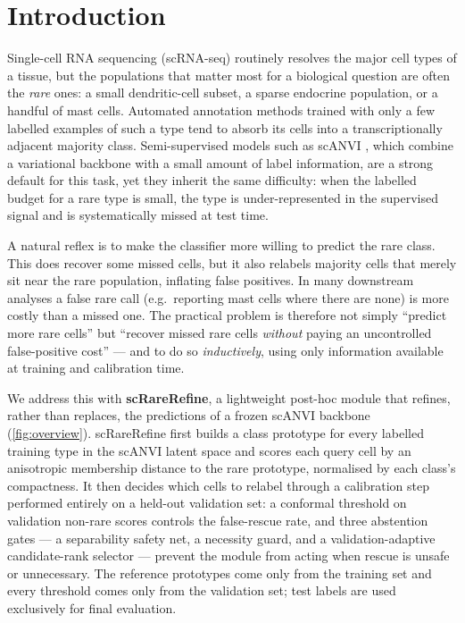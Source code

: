 \section{Introduction}
\label{sec:intro}

Single-cell RNA sequencing (scRNA-seq) routinely resolves the major cell types of a tissue, but the populations
that matter most for a biological question are often the \emph{rare} ones: a small dendritic-cell subset, a
sparse endocrine population, or a handful of mast cells. Automated annotation methods trained with only a few
labelled examples of such a type tend to absorb its cells into a transcriptionally adjacent majority class.
Semi-supervised models such as scANVI \citep{xu2021scanvi}, which combine a variational backbone with a small
amount of label information, are a strong default for this task, yet they inherit the same difficulty: when the
labelled budget for a rare type is small, the type is under-represented in the supervised signal and is
systematically missed at test time.

A natural reflex is to make the classifier more willing to predict the rare class. This does recover some missed
cells, but it also relabels majority cells that merely sit near the rare population, inflating false positives.
In many downstream analyses a false rare call (e.g.\ reporting mast cells where there are none) is more costly than
a missed one. The practical problem is therefore not simply ``predict more rare cells'' but ``recover missed rare
cells \emph{without} paying an uncontrolled false-positive cost'' --- and to do so \emph{inductively}, using only
information available at training and calibration time.

We address this with \textbf{scRareRefine}, a lightweight post-hoc module that refines, rather than replaces, the
predictions of a frozen scANVI backbone (\cref{fig:overview}). scRareRefine first builds a class prototype for every
labelled training type in the scANVI latent space and scores each query cell by an anisotropic membership distance
to the rare prototype, normalised by each class's compactness. It then decides which cells to relabel through a
calibration step performed entirely on a held-out validation set: a conformal threshold on validation non-rare
scores controls the false-rescue rate, and three abstention gates --- a separability safety net, a necessity guard,
and a validation-adaptive candidate-rank selector --- prevent the module from acting when rescue is unsafe or
unnecessary. The reference prototypes come only from the training set and every threshold comes only from the
validation set; test labels are used exclusively for final evaluation.

